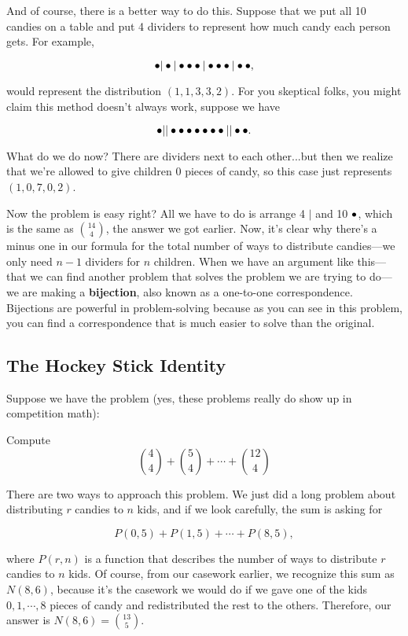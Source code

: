 And of course, there is a better way to do this. Suppose that we put all 10 candies on a table and put 4 dividers to represent how much candy each person gets. For example, 

$$\bullet |\bullet |\bullet \bullet \bullet |\bullet \bullet \bullet |\bullet \bullet,$$

would represent the distribution $(1, 1, 3, 3, 2)$. For you skeptical folks, you might claim this method doesn't always work, suppose we have 

$$\bullet ||\bullet \bullet \bullet \bullet \bullet \bullet \bullet ||\bullet \bullet.$$

What do we do now? There are dividers next to each other...but then we realize that we're allowed to give children 0 pieces of candy, so this case just represents $(1, 0, 7, 0, 2)$.

Now the problem is easy right? All we have to do is arrange 4 $|$ and 10 $\bullet$, which is the same as $\boxed{\binom{14}{4}}$, the answer we got earlier. Now, it's clear why there's a minus one in our formula for the total number of ways to distribute candies---we only need $n-1$ dividers for $n$ children. When we have an argument like this---that we can find another problem that solves the problem we are trying to do---we are making a \textbf{bijection}, also known as a one-to-one correspondence. Bijections are powerful in problem-solving because as you can see in this problem, you can find a correspondence that is much easier to solve than the original.

\subsection{The Hockey Stick Identity}

Suppose we have the problem (yes, these problems really do show up in competition math):

\begin{problem}
Compute 
$$\binom{4}{4}+\binom{5}{4}+\cdots+\binom{12}{4}$$
\end{problem}

There are two ways to approach this problem. We just did a long problem about distributing $r$ candies to $n$ kids, and if we look carefully, the sum is asking for

$$P(0,5)+P(1,5)+\cdots+P(8,5),$$

where $P(r,n)$ is a function that describes the number of ways to distribute $r$ candies to $n$ kids. Of course, from our casework earlier, we recognize this sum as $N(8,6)$, because it's the casework we would do if we gave one of the kids $0,1,\cdots,8$ pieces of candy and redistributed the rest to the others. Therefore, our answer is $N(8,6) = \boxed{\binom{13}{5}}$.

